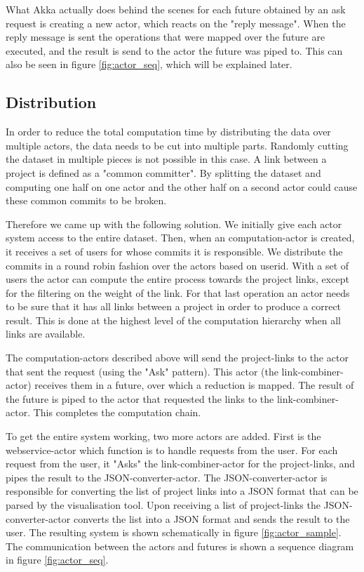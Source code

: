 \documentclass[10pt,a4paper]{article}
\begin{document}
What Akka actually does behind the scenes for each future obtained by an ask request is creating a new actor, which reacts on the "reply message". When the reply message is sent the operations that were mapped over the future are executed, and the result is send to the actor the future was piped to. This can also be seen in figure \ref{fig:actor_seq}, which will be explained later.

\subsection{Distribution}

In order to reduce the total computation time by distributing the data over multiple actors, the data needs to be cut into multiple parts. Randomly cutting the dataset in multiple pieces is not possible in this case. A link between a project is defined as a "common committer". By splitting the dataset and computing one half on one actor and the other half on a second actor could cause these common commits to be broken. 

Therefore we came up with the following solution. We initially give each actor system access to the entire dataset. Then, when an computation-actor is created, it receives a set of users for whose commits it is responsible. We distribute the commits in a round robin fashion over the actors based on userid. With a set of users the actor can compute the entire process towards the project links, except for the filtering on the weight of the link. For that last operation an actor needs to be sure that it has all links between a project in order to produce a correct result. This is done at the highest level of the computation hierarchy when all links are available.

The computation-actors described above will send the project-links to the actor that sent the request (using the "Ask" pattern). This actor (the link-combiner-actor) receives them in a future, over which a reduction is mapped. The result of the future is piped to the actor that requested the links to the link-combiner-actor. This completes the computation chain.

To get the entire system working, two more actors are added. First is the webservice-actor which function is to handle requests from the user. For each request from the user, it "Asks" the link-combiner-actor for the project-links, and pipes the result to the JSON-converter-actor. The JSON-converter-actor is responsible for converting the list of  project links into a JSON format that can be parsed by the visualisation tool. Upon receiving a list of project-links the JSON-converter-actor converts the list into a JSON format and sends the result to the user. The resulting system is shown schematically in figure \ref{fig:actor_sample}. The communication between the actors and futures is shown a sequence diagram in figure \ref{fig:actor_seq}.
\end{document}
